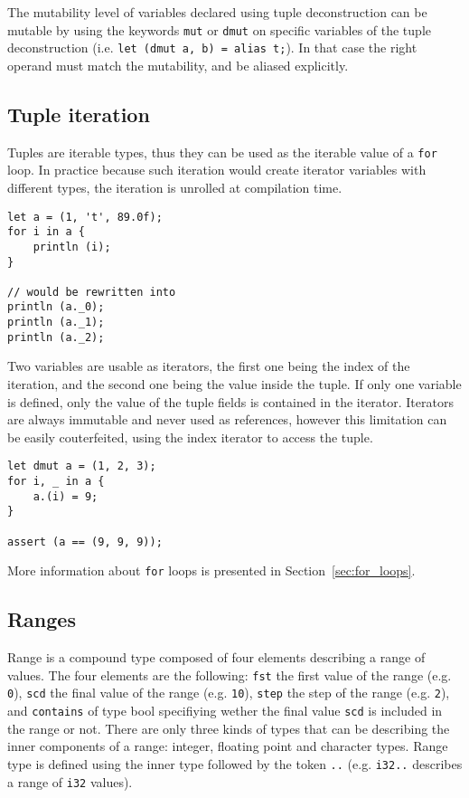 The mutability level of variables declared using tuple deconstruction can be
mutable by using the keywords \texttt{mut} or \texttt{dmut} on specific
variables of the tuple deconstruction (i.e. \texttt{let (dmut a, b) = alias
  t;}). In that case the right operand must match the mutability, and be aliased
explicitly.

\subsection {Tuple iteration}

Tuples are iterable types, thus they can be used as the iterable value of a
\texttt{for} loop. In practice because such iteration would create iterator
variables with different types, the iteration is unrolled at compilation time.

\begin{lstlisting}[style=coloredverbatim]
let a = (1, 't', 89.0f);
for i in a {
    println (i);
}

// would be rewritten into
println (a._0);
println (a._1);
println (a._2);
\end{lstlisting}

Two variables are usable as iterators, the first one being the index of the
iteration, and the second one being the value inside the tuple. If only one
variable is defined, only the value of the tuple fields is contained in the
iterator. Iterators are always immutable and never used as references, however
this limitation can be easily couterfeited, using the index iterator to access
the tuple.

\begin{lstlisting}[style=coloredverbatim]
let dmut a = (1, 2, 3);
for i, _ in a {
    a.(i) = 9;
}

assert (a == (9, 9, 9));
\end{lstlisting}

More information about \texttt{for} loops is presented in
Section~\ref{sec:for_loops}.

\subsection {Ranges}

Range is a compound type composed of four elements describing a range of values.
The four elements are the following: \texttt{fst} the first value of the range
(e.g. \texttt{0}), \texttt{scd} the final value of the range (e.g. \texttt{10}),
\texttt{step} the step of the range (e.g. \texttt{2}), and \texttt{contains} of
type bool specifiying wether the final value \texttt{scd} is included in the
range or not. There are only three kinds of types that can be describing the
inner components of a range: integer, floating point and character types. Range
type is defined using the inner type followed by the token \texttt{..} (e.g.
\texttt{i32..} describes a range of \texttt{i32} values).

